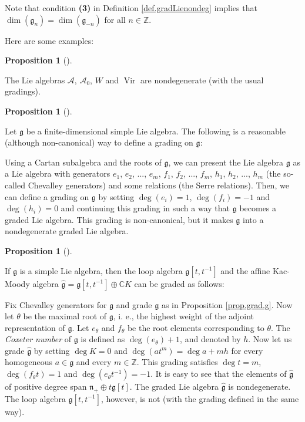 \documentclass
[numbers=enddot,12pt,final,onecolumn,german,notitlepage]{scrartcl}%
\theoremstyle{definition}
\newtheorem{prop}[theo]{Proposition}
\newenvironment{proposition}[1][]
{\begin{prop}[#1]\begin{leftbar}}
{\end{leftbar}\end{prop}}
\begin{document}
Note that condition \textbf{(3)} in Definition \ref{def.gradLienondeg} implies
that $\dim\left(  \mathfrak{g}_{n}\right)  =\dim\left(  \mathfrak{g}%
_{-n}\right)  $ for all $n\in\mathbb{Z}$.

Here are some examples:

\begin{proposition}
The Lie algebras $\mathcal{A}$, $\mathcal{A}_{0}$, $W$ and
$\operatorname*{Vir}$ are nondegenerate (with the usual gradings).
\end{proposition}

\begin{proposition}
\label{prop.grad.g}Let $\mathfrak{g}$ be a finite-dimensional simple Lie
algebra. The following is a reasonable (although non-canonical) way to define
a grading on $\mathfrak{g}$:

Using a Cartan subalgebra and the roots of $\mathfrak{g}$, we can present the
Lie algebra $\mathfrak{g}$ as a Lie algebra with generators $e_{1}$, $e_{2}$,
$...$, $e_{m}$, $f_{1}$, $f_{2}$, $...$, $f_{m}$, $h_{1}$, $h_{2}$, $...$,
$h_{m}$ (the so-called Chevalley generators) and some relations (the Serre
relations). Then, we can define a grading on $\mathfrak{g}$ by setting
$\deg\left(  e_{i}\right)  =1$, $\deg\left(  f_{i}\right)  =-1$ and
$\deg\left(  h_{i}\right)  =0$ and continuing this grading in such a way that
$\mathfrak{g}$ becomes a graded Lie algebra. This grading is non-canonical,
but it makes $\mathfrak{g}$ into a nondegenerate graded Lie algebra.
\end{proposition}

\begin{proposition}
If $\mathfrak{g}$ is a simple Lie algebra, then the loop algebra
$\mathfrak{g}\left[  t,t^{-1}\right]  $ and the affine Kac-Moody algebra
$\widehat{\mathfrak{g}}=\mathfrak{g}\left[  t,t^{-1}\right]  \oplus
\mathbb{C}K$ can be graded as follows:

Fix Chevalley generators for $\mathfrak{g}$ and grade $\mathfrak{g}$ as in
Proposition \ref{prop.grad.g}. Now let $\theta$ be the maximal root of
$\mathfrak{g}$, i. e., the highest weight of the adjoint representation of
$\mathfrak{g}$. Let $e_{\theta}$ and $f_{\theta}$ be the root elements
corresponding to $\theta$. The \textit{Coxeter number} of $\mathfrak{g}$ is
defined as $\deg\left(  e_{\theta}\right)  +1$, and denoted by $h$. Now let us
grade $\widehat{\mathfrak{g}}$ by setting $\deg K=0$ and $\deg\left(
at^{m}\right)  =\deg a+mh$ for every homogeneous $a\in\mathfrak{g}$ and every
$m\in\mathbb{Z}$. This grading satisfies $\deg t=m$, $\deg\left(  f_{\theta
}t\right)  =1$ and $\deg\left(  e_{\theta}t^{-1}\right)  =-1$. It is easy to
see that the elements of $\widehat{\mathfrak{g}}$ of positive degree span
$\mathfrak{n}_{+}\oplus t\mathfrak{g}\left[  t\right]  $. The graded Lie
algebra $\widehat{\mathfrak{g}}$ is nondegenerate. The loop algebra
$\mathfrak{g}\left[  t,t^{-1}\right]  $, however, is not (with the grading
defined in the same way).
\end{proposition}
\end{document}
